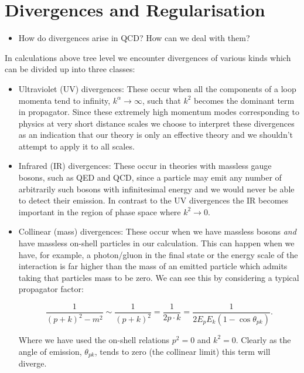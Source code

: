 \section{Divergences and Regularisation}

	\begin{itemize}
		\item How do divergences arise in QCD?  How can we deal with them?
	\end{itemize}

	In calculations above tree level we encounter divergences of various kinds which can be divided up into three classes:

	\begin{itemize}
		\item Ultraviolet (UV) divergences:  These occur when all the components of a loop momenta tend to
		infinity, $k^\alpha\rightarrow\infty$, such that $k^2$ becomes the dominant term in propagator.
		Since these extremely high momentum modes corresponding to physics at very short distance scales
		we choose to interpret these divergences as an indication that our theory is only an
		effective theory and we shouldn't attempt to apply it to all scales.

		\item Infrared (IR) divergences:  These occur in theories with massless gauge bosons, such as
		QED and QCD, since a particle may emit any number of arbitrarily such bosons with infinitesimal
		energy and we would never be able to detect their emission.  In contrast to the UV divergences
		the IR becomes important in the region of phase space where $k^2\rightarrow0$.

		\item Collinear (mass) divergences: These occur when we have massless bosons \emph{and} have
		massless on-shell particles in our calculation.  This can happen when we have, for example,
		a photon/gluon in the final state or the energy scale of the interaction is far higher than
		the mass of an emitted particle which admits taking that particles mass to be zero.
		We can see this by considering a typical propagator factor:

		\begin{equation}
			\frac{1}{(p+k)^2-m^2}\sim\frac{1}{(p+k)^2} = \frac{1}{2p\cdot k} = \frac{1}{2E_pE_k(1-\cos\theta_{pk})}.
		\end{equation}

		Where we have used the on-shell relations $p^2=0$ and $k^2=0$.  Clearly as the angle of
		emission, $\theta_{pk}$, tends to zero (the collinear limit) this term will diverge.
	\end{itemize}

